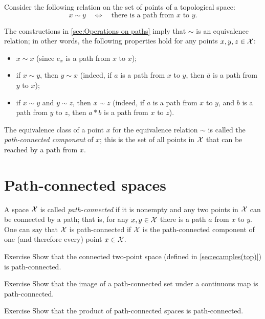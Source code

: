 Consider the following relation on the set of points of a topological space:
\[x\sim y \quad\Leftrightarrow\quad\text{there is a path from $x$ to $y$.}\]

The constructions in \ref{sec:Operations on paths} imply that $\sim$ is an equivalence relation; in other words, the following properties hold for any points $x,y,z\in \mathcal{X}$:
\begin{itemize}
 \item $x\sim x$ (since $e_x$ is a path from $x$ to $x$);
 \item if $x\sim y$, then $y\sim x$ (indeed, if $a$ is a path from $x$ to $y$, then $\bar a$ is a path from $y$ to $x$);
 \item if $x\sim y$ and $y\sim z$, then $x\sim z$ (indeed, if $a$ is a path from $x$ to $y$,
 and $b$ is a path from $y$ to $z$, then $a*b$ is a path from $x$ to $z$).
\end{itemize}

The equivalence class of a point $x$ for the equivalence relation $\sim$ is called the \emph{path-connected component} of $x$;
this is the set of all points in $\mathcal{X}$ that can be reached by a path from $x$.


\section{Path-connected spaces}\label{sec:flea and comb}

A space $\mathcal{X}$ is called \emph{path-connected} if it is nonempty and any two points in $\mathcal{X}$ can be connected by a path;
that is, for any $x,y\in \mathcal{X}$ there is a path $a$ from $x$ to $y$.
One can say that $\mathcal{X}$ is path-connected if $\mathcal{X}$ is the path-connected component of one (and therefore every) point $x\in\mathcal{X}$.

\begin{thm}{Exercise}\label{ex:two-point-path-connected}
Show that the connected two-point space (defined in \ref{sec:ecamples(top)}) is path-connected.
\end{thm}

\begin{thm}{Exercise}\label{ex:image(path-connected)}
Show that the image of a path-connected set under a continuous map is path-connected.
\end{thm}

\begin{thm}{Exercise}\label{ex:product(path-connected)}
Show that the product of path-connected spaces is path-connected.
\end{thm}

